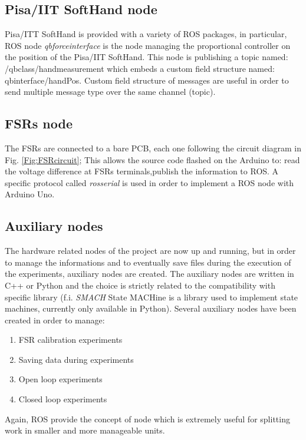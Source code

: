 \subsection{Pisa/IIT SoftHand node}
Pisa/ITT SoftHand is provided with a variety of ROS packages, in particular, ROS node \textit{qb\textunderscore force\textunderscore interface} is the node managing the proportional controller on the position of the Pisa/IIT SoftHand. This node is publishing a topic named: /qb\textunderscore class/hand\textunderscore measurement which embeds a custom field structure named: qb\textunderscore interface/handPos. Custom field structure of messages are useful in order to send multiple message type over the same channel (topic).

\subsection{FSRs node}
The FSRs are connected to a bare PCB, each one following the circuit diagram in Fig. \ref{Fig:FSRcircuit}; This allows the source code flashed on the Arduino to: read the voltage difference at FSRs terminals,publish the information to ROS.
A specific protocol called \textit{rosserial} is used in order to implement a ROS node with Arduino Uno.

\subsection{Auxiliary nodes}
The hardware related nodes of the project are now up and running, but in order to manage the informations and to eventually save files during the execution of the experiments, auxiliary nodes are created.
The auxiliary nodes are written in C++ or Python and the choice is strictly related to the compatibility with specific library (f.i. \textit{SMACH} State MACHine is a library used to implement state machines, currently only available in Python).
Several auxiliary nodes have been created in order to manage:

\begin{enumerate}
\item FSR calibration experiments
\item Saving data during experiments
\item Open loop experiments
\item Closed loop experiments
\end{enumerate}
Again, ROS provide the concept of node which is extremely useful for splitting work in smaller and more manageable units.

